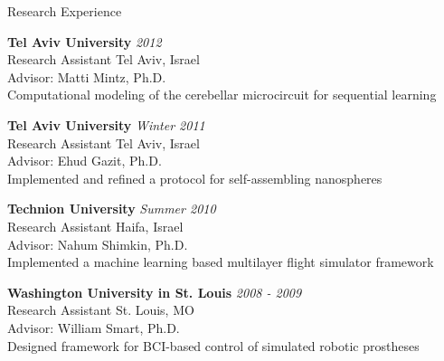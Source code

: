 \documentclass{resume} %
\begin{document}
\begin{rSection}{Research Experience}


\textbf{Tel Aviv University} \hfill \emph{2012} \\
Research Assistant \hfill Tel Aviv, Israel \\
Advisor: Matti Mintz, Ph.D. \\
Computational modeling of the cerebellar microcircuit for sequential learning

\textbf{Tel Aviv University} \hfill \emph{Winter 2011} \\
Research Assistant \hfill Tel Aviv, Israel \\
Advisor: Ehud Gazit, Ph.D. \\
Implemented and refined a protocol for self-assembling nanospheres

\textbf{Technion University} \hfill \emph{Summer 2010} \\
Research Assistant \hfill Haifa, Israel \\
Advisor: Nahum Shimkin, Ph.D. \\
Implemented a machine learning based multilayer flight simulator framework

\textbf{Washington University in St. Louis} \hfill \emph{2008 - 2009} \\
Research Assistant \hfill St. Louis, MO \\
Advisor: William Smart, Ph.D. \\
Designed framework for BCI-based control of simulated robotic prostheses

\end{rSection}

\end{document}
